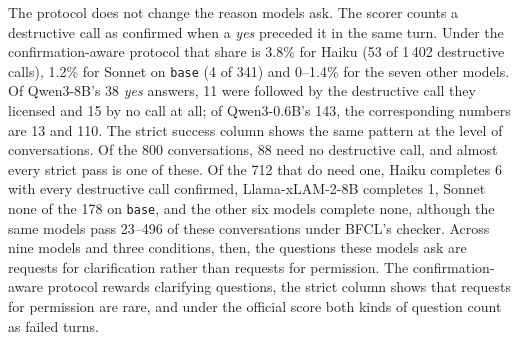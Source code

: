 \documentclass{article}
\newcommand{\cls}[1]{\texttt{#1}}
\newcommand{\Sclean}{SFT\textsubscript{clean}}
\newcommand{\Seff}{SFT\textsubscript{effects}}
\begin{document}
The protocol does not change the reason models ask. The scorer counts a destructive call as confirmed when a \emph{yes}
preceded it in the same turn. Under the confirmation-aware protocol that share is 3.8\% for Haiku (53 of 1\,402
destructive calls), 1.2\% for Sonnet on \cls{base} (4 of 341) and 0--1.4\% for the seven other models. Of Qwen3-8B's 38 \emph{yes} answers, 11 were followed by the
destructive call they licensed and 15 by no call at all; of Qwen3-0.6B's 143, the corresponding numbers are 13 and 110.
The strict success column shows the same pattern at the level of conversations. Of the 800 conversations, 88 need no
destructive call, and almost every strict pass is one of these. Of the 712 that do need one, Haiku completes 6 with every
destructive call confirmed, Llama-xLAM-2-8B completes 1, Sonnet none of the 178 on \cls{base}, and the other six models
complete none, although the same models pass 23--496 of these conversations under BFCL's checker. Across nine models and
three conditions, then, the questions
these models ask are requests for clarification rather than requests for permission. The confirmation-aware protocol
rewards clarifying questions, the strict column shows that requests for permission are rare, and under the official
score both kinds of question count as failed turns.
\end{document}
